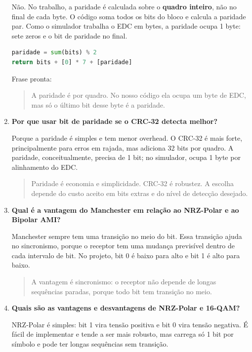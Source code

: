 \documentclass[11pt,a4paper]{article}
\newcommand{\rank}[1]{\textcolor{rankblue}{\textbf{Rank #1}}}
\begin{document}
\begin{enumerate}[leftmargin=1.2cm, itemsep=8pt]
  Não. No trabalho, a paridade é calculada sobre o \textbf{quadro inteiro}, não no final de cada byte. O código soma todos os bits do bloco e calcula a paridade par. Como o simulador trabalha o EDC em bytes, a paridade ocupa 1 byte: sete zeros e o bit de paridade no final.

  \begin{lstlisting}[language=Python]
paridade = sum(bits) % 2
return bits + [0] * 7 + [paridade]
  \end{lstlisting}

  Frase pronta:

  \begin{quote}
  A paridade é por quadro. No nosso código ela ocupa um byte de EDC, mas só o último bit desse byte é a paridade.
  \end{quote}

  \item[\rank{5}.] \textbf{Por que usar bit de paridade se o CRC-32 detecta melhor?}

  Porque a paridade é simples e tem menor overhead. O CRC-32 é mais forte, principalmente para erros em rajada, mas adiciona 32 bits por quadro. A paridade, conceitualmente, precisa de 1 bit; no simulador, ocupa 1 byte por alinhamento do EDC.

  \begin{quote}
  Paridade é economia e simplicidade. CRC-32 é robustez. A escolha depende do custo aceito em bits extras e do nível de detecção desejado.
  \end{quote}

  \item[\rank{6}.] \textbf{Qual é a vantagem do Manchester em relação ao NRZ-Polar e ao Bipolar AMI?}

  Manchester sempre tem uma transição no meio do bit. Essa transição ajuda no sincronismo, porque o receptor tem uma mudança previsível dentro de cada intervalo de bit. No projeto, bit 0 é baixo para alto e bit 1 é alto para baixo.

  \begin{quote}
  A vantagem é sincronismo: o receptor não depende de longas sequências paradas, porque todo bit tem transição no meio.
  \end{quote}

  \item[\rank{7}.] \textbf{Quais são as vantagens e desvantagens de NRZ-Polar e 16-QAM?}

  NRZ-Polar é simples: bit 1 vira tensão positiva e bit 0 vira tensão negativa. É fácil de implementar e tende a ser mais robusto, mas carrega só 1 bit por símbolo e pode ter longas sequências sem transição.


\end{enumerate}
\end{document}
